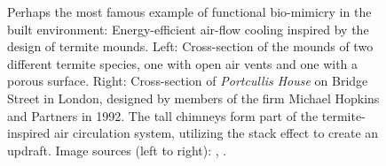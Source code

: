 \documentclass{article}
\begin{document}
\begin{figure}[ht!]
    \centering
    \caption{Perhaps the most famous example of functional bio-mimicry in the built environment: Energy-efficient air-flow cooling inspired by the design of termite mounds. Left: Cross-section of the mounds of two different termite species, one with open air vents and one with a porous surface. Right: Cross-section of \textit{Portcullis House} on Bridge Street in London, designed by members of the firm Michael Hopkins and Partners in 1992. The tall chimneys form part of the termite-inspired air circulation system, utilizing the stack effect to create an updraft. \newline Image sources (left to right): \cite{turner_beyond_2008}, \cite{davies_hopkins2_2001}.}
    \label{fig:porte_binet}
\end{figure}

\clearpage
\printbibliography
\end{document}
